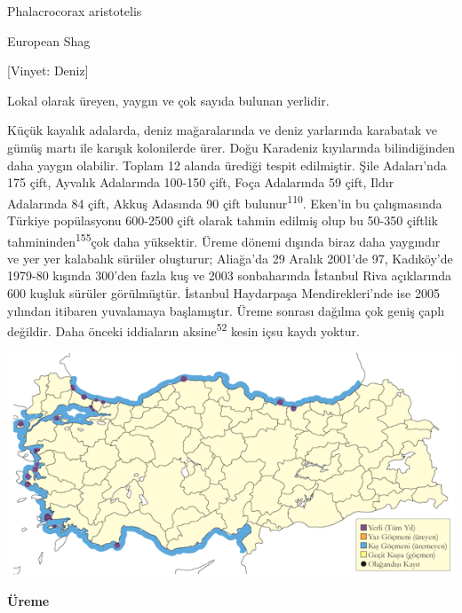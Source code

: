 \documentclass[
  letterpaper,
  DIV=11,
  numbers=noendperiod]{scrreprt}
\begin{document}
Phalacrocorax aristotelis

European Shag

{[}Vinyet: Deniz{]}

Lokal olarak üreyen, yaygın ve çok sayıda bulunan yerlidir.

Küçük kayalık adalarda, deniz mağaralarında ve deniz yarlarında
karabatak ve gümüş martı ile karışık kolonilerde ürer. Doğu Karadeniz
kıyılarında bilindiğinden daha yaygın olabilir. Toplam 12 alanda ürediği
tespit edilmiştir. Şile Adaları'nda 175 çift, Ayvalık Adalarında 100-150
çift, Foça Adalarında 59 çift, Ildır Adalarında 84 çift, Akkuş Adasında
90 çift bulunur\textsuperscript{110}. Eken'in bu çalışmasında Türkiye
popülasyonu 600-2500 çift olarak tahmin edilmiş olup bu 50-350 çiftlik
tahmininden\textsuperscript{155}çok daha yüksektir. Üreme dönemi dışında
biraz daha yaygındır ve yer yer kalabalık sürüler oluşturur; Aliağa'da
29 Aralık 2001'de 97, Kadıköy'de 1979-80 kışında 300'den fazla kuş ve
2003 sonbaharında İstanbul Riva açıklarında 600 kuşluk sürüler
görülmüştür. İstanbul Haydarpaşa Mendirekleri'nde ise 2005 yılından
itibaren yuvalamaya başlamıştır. Üreme sonrası dağılma çok geniş çaplı
değildir. Daha önceki iddiaların aksine\textsuperscript{52} kesin içsu
kaydı yoktur.

\includegraphics{images/harita_Page_078.png}

\textbf{Üreme}
\end{document}
